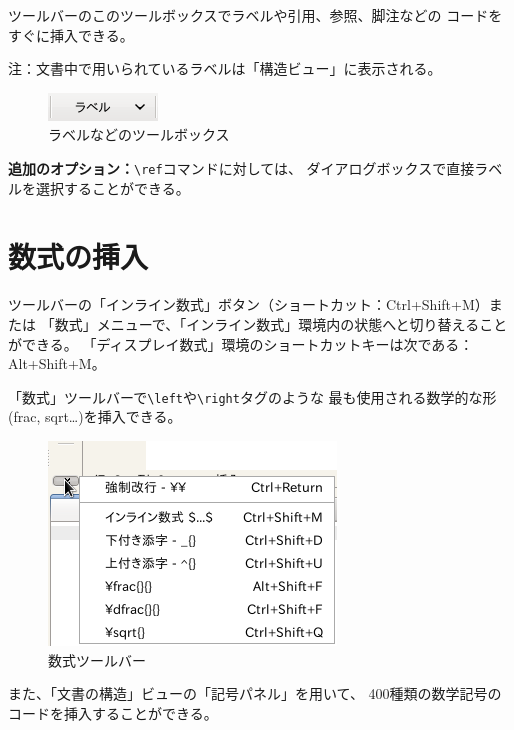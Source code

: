 ツールバーのこのツールボックスでラベルや引用、参照、脚注などの
コードをすぐに挿入できる。

注：文書中で用いられているラベルは「構造ビュー」に表示される。

\begin{figure}[H]
  \centering
  \includegraphics{doc10.png}
  \caption{ラベルなどのツールボックス}
\end{figure}

\textbf{追加のオプション：}\verb+\ref+コマンドに対しては、
ダイアログボックスで直接ラベルを選択することができる。

\section{数式の挿入}

ツールバーの「インライン数式」ボタン（ショートカット：Ctrl+Shift+M）または
「数式」メニューで、「インライン数式」環境内の状態へと切り替えることができる。
「ディスプレイ数式」環境のショートカットキーは次である：Alt+Shift+M。

「数式」ツールバーで\verb+\left+や\verb+\right+タグのような
最も使用される数学的な形(frac, sqrt\ldots{})を挿入できる。

\begin{figure}[H]
  \centering
  \includegraphics{doc11.png}
  \caption{数式ツールバー}
\end{figure}

また、「文書の構造」ビューの「記号パネル」を用いて、
400種類の数学記号のコードを挿入することができる。

